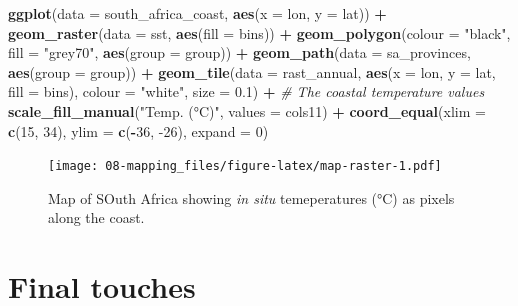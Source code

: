 \documentclass[
]{book}
\newenvironment{Shaded}{\begin{snugshade}}{\end{snugshade}}
\newcommand{\CommentTok}[1]{\textcolor[rgb]{0.56,0.35,0.01}{\textit{#1}}}
\newcommand{\DataTypeTok}[1]{\textcolor[rgb]{0.13,0.29,0.53}{#1}}
\newcommand{\DecValTok}[1]{\textcolor[rgb]{0.00,0.00,0.81}{#1}}
\newcommand{\FloatTok}[1]{\textcolor[rgb]{0.00,0.00,0.81}{#1}}
\newcommand{\KeywordTok}[1]{\textcolor[rgb]{0.13,0.29,0.53}{\textbf{#1}}}
\newcommand{\NormalTok}[1]{#1}
\newcommand{\OperatorTok}[1]{\textcolor[rgb]{0.81,0.36,0.00}{\textbf{#1}}}
\newcommand{\StringTok}[1]{\textcolor[rgb]{0.31,0.60,0.02}{#1}}
\begin{document}
\begin{Shaded}
\begin{Highlighting}[]
\KeywordTok{ggplot}\NormalTok{(}\DataTypeTok{data =}\NormalTok{ south\_africa\_coast, }\KeywordTok{aes}\NormalTok{(}\DataTypeTok{x =}\NormalTok{ lon, }\DataTypeTok{y =}\NormalTok{ lat)) }\OperatorTok{+}
\StringTok{  }\KeywordTok{geom\_raster}\NormalTok{(}\DataTypeTok{data =}\NormalTok{ sst, }\KeywordTok{aes}\NormalTok{(}\DataTypeTok{fill =}\NormalTok{ bins)) }\OperatorTok{+}
\StringTok{  }\KeywordTok{geom\_polygon}\NormalTok{(}\DataTypeTok{colour =} \StringTok{"black"}\NormalTok{, }\DataTypeTok{fill =} \StringTok{"grey70"}\NormalTok{, }\KeywordTok{aes}\NormalTok{(}\DataTypeTok{group =}\NormalTok{ group)) }\OperatorTok{+}
\StringTok{  }\KeywordTok{geom\_path}\NormalTok{(}\DataTypeTok{data =}\NormalTok{ sa\_provinces, }\KeywordTok{aes}\NormalTok{(}\DataTypeTok{group =}\NormalTok{ group)) }\OperatorTok{+}
\StringTok{  }\KeywordTok{geom\_tile}\NormalTok{(}\DataTypeTok{data =}\NormalTok{ rast\_annual, }\KeywordTok{aes}\NormalTok{(}\DataTypeTok{x =}\NormalTok{ lon, }\DataTypeTok{y =}\NormalTok{ lat, }\DataTypeTok{fill =}\NormalTok{ bins), }
            \DataTypeTok{colour =} \StringTok{"white"}\NormalTok{, }\DataTypeTok{size =} \FloatTok{0.1}\NormalTok{) }\OperatorTok{+}\StringTok{ }\CommentTok{\# The coastal temperature values}
\StringTok{  }\KeywordTok{scale\_fill\_manual}\NormalTok{(}\StringTok{"Temp. (°C)"}\NormalTok{, }\DataTypeTok{values =}\NormalTok{ cols11) }\OperatorTok{+}
\StringTok{  }\KeywordTok{coord\_equal}\NormalTok{(}\DataTypeTok{xlim =} \KeywordTok{c}\NormalTok{(}\DecValTok{15}\NormalTok{, }\DecValTok{34}\NormalTok{), }\DataTypeTok{ylim =} \KeywordTok{c}\NormalTok{(}\OperatorTok{{-}}\DecValTok{36}\NormalTok{, }\DecValTok{{-}26}\NormalTok{), }\DataTypeTok{expand =} \DecValTok{0}\NormalTok{)}
\end{Highlighting}
\end{Shaded}

\begin{figure}
\centering
\texttt{[image: 08-mapping\_files/figure-latex/map-raster-1.pdf]}
\caption{\label{fig:map-raster}Map of SOuth Africa showing \emph{in situ} temeperatures (°C) as pixels along the coast.}
\end{figure}

\hypertarget{final-touches}{%
\section{Final touches}\label{final-touches}}
\end{document}
